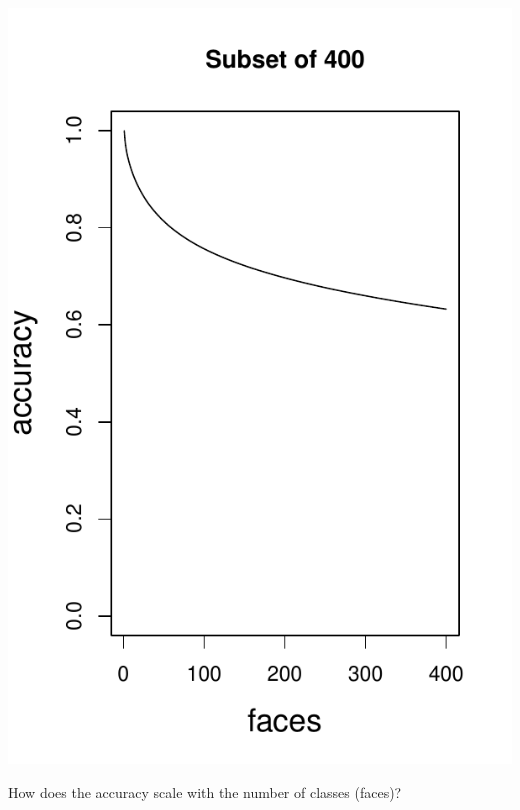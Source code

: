 \documentclass{beamer}
\begin{document}
\begin{frame}
\begin{center}
\includegraphics[scale = 0.3]{../facerec/acc_plot1.pdf}\pause
\end{center}

How does the accuracy scale with the number of classes (faces)?
\end{frame}
\end{document}
